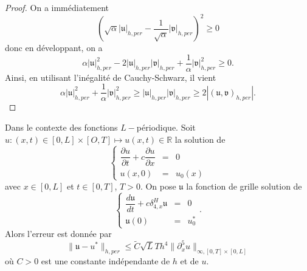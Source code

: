 \begin{proof}
On a immédiatement
\begin{equation}
\left( \sqrt{\alpha} |\mathfrak{u}|_{h,per} - \dfrac{1}{\sqrt{\alpha}} |\mathfrak{v}|_{h,per} \right)^2 \geq 0
\end{equation}
donc en développant, on a
\begin{equation}
\alpha |\mathfrak{u}|_{h,per}^2 - 2 |\mathfrak{u}|_{h,per} |\mathfrak{v}|_{h,per} + \dfrac{1}{\alpha} |\mathfrak{v}|_{h,per}^2 \geq 0.
\end{equation}
Ainsi, en utilisant l'inégalité de Cauchy-Schwarz, il vient
\begin{equation}
\alpha |\mathfrak{u}|_{h,per}^2 + \dfrac{1}{\alpha} |\mathfrak{v}|_{h,per}^2 \geq |\mathfrak{u}|_{h,per} |\mathfrak{v}|_{h,per} \geq 2|(\mathfrak{u}, \mathfrak{v})_{h,per}|.
\end{equation}
\end{proof}







\begin{proposition}
Dans le contexte des fonctions $L-$périodique.
Soit $u : (x,t) \in [0,L] \times [O, T] \mapsto u(x,t) \in \mathbb{R}$ la solution de 
\begin{equation}
\left\lbrace
\begin{array}{rcl}
\dfrac{\partial u}{\partial t} + c \dfrac{\partial u}{\partial x} & = & 0\\
u(x,0) & = & u_0(x) 
\end{array}
\right.
\end{equation}
avec $x \in [0,L]$ et $t \in [0,T]$, $T>0$.
On pose $\mathfrak{u}$ la fonction de grille solution de 
\begin{equation}
\left\lbrace
\begin{array}{rcl}
\dfrac{d \mathfrak{u}}{dt} + c \delta_{4,x}^H \mathfrak{u} & = & 0\\
\mathfrak{u}(0) & = & u_0^* 
\end{array}
\right. .
\end{equation}
Alors l'erreur est donnée par
\begin{equation}
\| \mathfrak{u} - u^* \|_{h,per} \leq \tilde{C} \sqrt{L} T h^4 \| \partial^5_x u \|_{\infty,[0,T] \times [0,L]}
\end{equation}
où $C>0$ est une constante indépendante de $h$ et de $u$.
\end{proposition}

